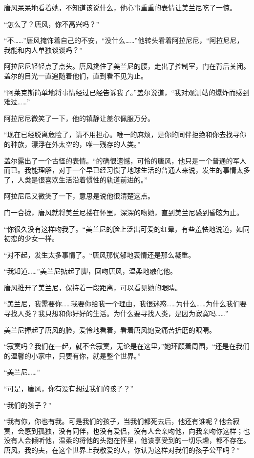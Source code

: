 唐风呆呆地看着她，不知道该说什么，他心事重重的表情让美兰尼吃了一惊。

“怎么了？唐风，你不高兴吗？”

“不……”唐风掩饰着自己的不安，“没什么……”他转头看着阿拉尼尼，“阿拉尼尼，我能和内人单独谈谈吗？”

阿拉尼尼轻轻点了点头。唐风搀住了美兰尼的腰，走出了控制室，门在背后关闭。盖尔的目光一直追随着他们，直到看不见为止。

“阿莱克斯简单地将事情经过已经告诉我了。”盖尔说道，“我对观测站的爆炸而感到难过……”

阿拉尼尼微笑了一下，他的镇静让盖尔佩服万分。

“现在已经脱离危险了，请不用担心。唯一的麻烦，是你的同伴拒绝和你去找寻你的种族，漂浮在外太空的，唯一残存的人类。”

盖尔露出了一个古怪的表情。“的确很遗憾，可怜的唐风，他只是一个普通的军人而已。我能理解，对于一个早已经习惯了地球生活的普通人来说，发生的事情太多了，人类是很喜欢生活沿着惯性的轨道前进的。”

阿拉尼尼又微笑了一下，意思是说他很清楚这点。

门一合拢，唐风就将美兰尼搂在怀里，深深的吻她，直到美兰尼感到昏眩为止。

“你很久没有这样吻我了。“美兰尼的脸上泛出可爱的红晕，有些羞怯地说道，如同初恋的少女一样。

“对不起，发生太多事情了。“唐风那忧郁地表情还是那么凝重。

“我知道……”美兰尼掂起了脚，回吻唐风，温柔地融化他。

唐风推开了美兰尼，保持着一段距离，可以看见她的眼睛。

“美兰尼，我需要你……我要你给我一个理由，我很迷惑……为什么……为什么我们要寻找人类？我只想和你好好的生活。为什么要寻找人类，是因为寂寞吗……”

美兰尼捧起了唐风的脸，爱怜地看着，看着唐风饱受痛苦折磨的眼睛。

“寂寞吗？我们在一起，就不会寂寞，无论是在这里，”她环顾着周围，“还是在我们的温馨的小家中，只要有你，就是整个世界。”

“美兰尼……”

“可是，唐风，你有没有想过我们的孩子？”

“我们的孩子？”

“我有你，你也有我。可是我们的孩子，当我们都死去后，他还有谁呢？他会寂寞，会感到孤独，没有同伴，也没有爱侣，没有人会亲吻他，向我亲吻你这样；也没有人会倾听他，温柔的将他的头抱在怀里，他该享受到的一切乐趣，都不存在。唐风，我的夫，在这个世界上我敬爱的人，你认为这样对我们的孩子公平吗？”

